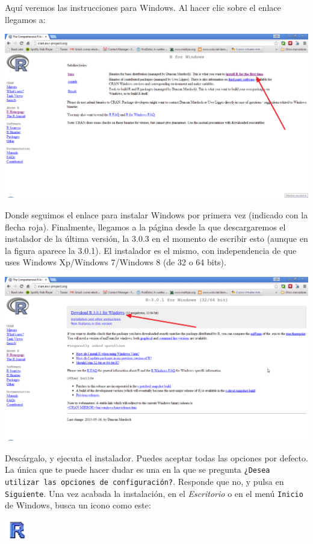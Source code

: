 \documentclass[10pt,a4paper]{article}\usepackage[]{graphicx}\usepackage[]{color}
\begin{document}
Aquí veremos las instrucciones para Windows. Al hacer clic sobre el enlace llegamos a:
    \begin{center}
    \includegraphics[width=15cm]{../fig/Tut00-37.png}
    \end{center}
Donde seguimos el enlace para instalar Windows por primera vez (indicado con la flecha roja).
Finalmente, llegamos a la página desde la que descargaremos el instalador de la última versión, la
3.0.3 en el momento de escribir esto (aunque en la figura aparece la 3.0.1). El instalador es el
mismo, con independencia de que uses Windows Xp/Windows 7/Windows 8 (de 32 o 64 bits).
    \begin{center}
    \includegraphics[width=15cm]{../fig/Tut00-38.png}
    \end{center}
Descárgalo, y ejecuta el instalador. Puedes aceptar todas las opciones por defecto. La única que te
puede hacer dudar es una en la que se pregunta {\tt ¿Desea utilizar las opciones de
configuración?}. Responde que no, y pulsa en {\tt Siguiente}. Una vez acabada la instalación, en el
{\em Escritorio} o en el menú {\tt Inicio} de Windows, busca un icono como este:
    \begin{center}
    \includegraphics[width=1cm]{../fig/Tut00-39.png}
    \end{center}
\end{document}
